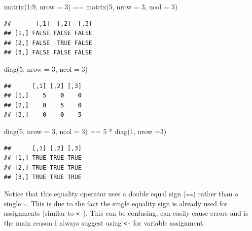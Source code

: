 \documentclass[
]{book}
\newenvironment{Shaded}{\begin{snugshade}}{\end{snugshade}}
\newcommand{\AttributeTok}[1]{\textcolor[rgb]{0.77,0.63,0.00}{#1}}
\newcommand{\DecValTok}[1]{\textcolor[rgb]{0.00,0.00,0.81}{#1}}
\newcommand{\FunctionTok}[1]{\textcolor[rgb]{0.00,0.00,0.00}{#1}}
\newcommand{\NormalTok}[1]{#1}
\newcommand{\SpecialCharTok}[1]{\textcolor[rgb]{0.00,0.00,0.00}{#1}}
\theoremstyle{definition}
\theoremstyle{definition}
\theoremstyle{definition}
\theoremstyle{definition}
\theoremstyle{remark}
\begin{document}
\begin{Shaded}
\begin{Highlighting}[]
\FunctionTok{matrix}\NormalTok{(}\DecValTok{1}\SpecialCharTok{:}\DecValTok{9}\NormalTok{, }\AttributeTok{nrow =} \DecValTok{3}\NormalTok{) }\SpecialCharTok{==} \FunctionTok{matrix}\NormalTok{(}\DecValTok{5}\NormalTok{, }\AttributeTok{nrow =} \DecValTok{3}\NormalTok{, }\AttributeTok{ncol =} \DecValTok{3}\NormalTok{)}
\end{Highlighting}
\end{Shaded}

\begin{verbatim}
##       [,1]  [,2]  [,3]
## [1,] FALSE FALSE FALSE
## [2,] FALSE  TRUE FALSE
## [3,] FALSE FALSE FALSE
\end{verbatim}

\begin{Shaded}
\begin{Highlighting}[]
\FunctionTok{diag}\NormalTok{(}\DecValTok{5}\NormalTok{, }\AttributeTok{nrow =} \DecValTok{3}\NormalTok{, }\AttributeTok{ncol =} \DecValTok{3}\NormalTok{)}
\end{Highlighting}
\end{Shaded}

\begin{verbatim}
##      [,1] [,2] [,3]
## [1,]    5    0    0
## [2,]    0    5    0
## [3,]    0    0    5
\end{verbatim}

\begin{Shaded}
\begin{Highlighting}[]
\FunctionTok{diag}\NormalTok{(}\DecValTok{5}\NormalTok{, }\AttributeTok{nrow =} \DecValTok{3}\NormalTok{, }\AttributeTok{ncol =} \DecValTok{3}\NormalTok{) }\SpecialCharTok{==} \DecValTok{5} \SpecialCharTok{*} \FunctionTok{diag}\NormalTok{(}\DecValTok{1}\NormalTok{, }\AttributeTok{nrow =}\DecValTok{3}\NormalTok{)}
\end{Highlighting}
\end{Shaded}

\begin{verbatim}
##      [,1] [,2] [,3]
## [1,] TRUE TRUE TRUE
## [2,] TRUE TRUE TRUE
## [3,] TRUE TRUE TRUE
\end{verbatim}

Notice that this equality operator uses a double equal sign (\texttt{==}) rather than a single \texttt{=}. This is due to the fact the single equality sign is already used for assignments (similar to \texttt{\textless{}-}). This can be confusing, can easily cause errors and is the main reason I always suggest using \texttt{\textless{}-} for variable assignment.
\end{document}
